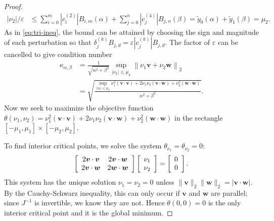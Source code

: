 \documentclass[3p, authoryear, square]{elsarticle}
\theoremstyle{definition}
\newcommand{\eps}{\varepsilon}
\begin{document}
\begin{proof}
\begin{align}
\left|\nu_2\right| / \eps &\leq \sum_{i = 0}^m
  \left|c_{i}^{(2)}\right| B_{i, m}\left(\alpha\right) + \sum_{j = 0}^n
  \left|c_{j}^{(4)}\right| B_{j, n}\left(\beta\right) =
  \widetilde{y}_0(\alpha) + \widetilde{y}_1(\beta) = \mu_2.
\end{align}
As in \eqref{eq:tri-ineq}, the bound can be attained by choosing the
sign and magnitude of each perturbation so that
\(\delta_j^{(k)} B_{j, d} = \eps \left|c_j^{(k)}\right| B_{j, d}\).
The factor of \(\eps\) can be cancelled to give condition number
\begin{align}
\kappa_{\alpha, \beta} &= \frac{1}{\sqrt{\alpha^2 + \beta^2}}
  \sup_{\left|\nu_k\right| \leq \mu_k} \left \lVert \nu_1 \bm{v} +
  \nu_2 \bm{w} \right \rVert_2 \\
  &=
  \sqrt{\frac{\sup_{\left|\nu_k\right| \leq \mu_k}
  \nu_1^2 \left(\bm{v} \cdot \bm{v}\right) +
  2 \nu_1 \nu_2 \left(\bm{v} \cdot \bm{w}\right) +
  \nu_2^2 \left(\bm{w} \cdot \bm{w}\right)}{\alpha^2 + \beta^2}}
  \label{eq:intersect-cond-num}.
\end{align}
Now we seek to maximize the objective function \(\theta(\nu_1, \nu_2) =
\nu_1^2 \left(\bm{v} \cdot \bm{v}\right) +
2 \nu_1 \nu_2 \left(\bm{v} \cdot \bm{w}\right) +
\nu_2^2 \left(\bm{w} \cdot \bm{w}\right)\) in the rectangle
\(\left[-\mu_1, \mu_1\right] \times \left[-\mu_2, \mu_2\right]\).

To find interior critical points, we solve the system \(\theta_{\nu_1} =
\theta_{\nu_2} = 0\):
\begin{equation}
\left[ \begin{array}{c c}
  2 \bm{v} \cdot \bm{v} & 2 \bm{v} \cdot \bm{w} \\
  2 \bm{v} \cdot \bm{w} & 2 \bm{w} \cdot \bm{w} \end{array}\right]
\left[ \begin{array}{c} \nu_1 \\ \nu_2 \end{array}\right] =
\left[ \begin{array}{c} 0 \\ 0 \end{array}\right].
\end{equation}
This system has the unique solution \(\nu_1 = \nu_2 = 0\) unless
\(\|\bm{v}\|_2 \|\bm{w}\|_2 = \left|\bm{v} \cdot \bm{w}\right|\).
By the Cauchy-Schwarz inequality, this can only occur if \(\bm{v}\) and
\(\bm{w}\) are parallel; since \(J^{-1}\) is invertible, we know they
are not. Hence \(\theta(0, 0) = 0\) is the only interior critical point and
it is the global minimum.


\end{proof}
\end{document}
